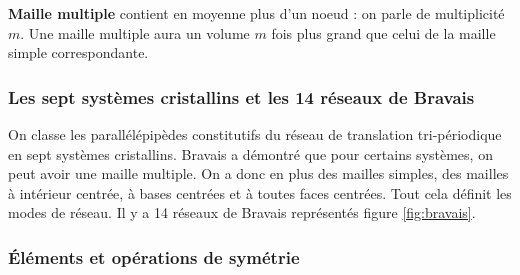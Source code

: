 \documentclass{article}
\begin{document}
\noindent\textbf{Maille multiple} contient en moyenne plus d'un noeud : on parle de multiplicité $m$.
Une maille multiple aura un volume $m$ fois plus grand que celui de la maille simple correspondante.


\subsubsection{Les sept systèmes cristallins et les 14 réseaux de Bravais}\label{subsec:les-sept-systemes-cristallins-et-les-14-reseaux-de-bravais}

On classe les parallélépipèdes constitutifs du réseau de translation tri-périodique en sept systèmes cristallins.
Bravais a démontré que pour certains systèmes, on peut avoir une maille multiple.
On a donc en plus des mailles simples, des mailles à intérieur centrée, à bases centrées et à toutes faces centrées.
Tout cela définit les modes de réseau.
Il y a 14 réseaux de Bravais représentés figure \ref{fig:bravais}.

\vspace{0.4cm}
\subsubsection{Éléments et opérations de symétrie}\label{subsec:elements-et-operations-de-symetrie}
\end{document}

